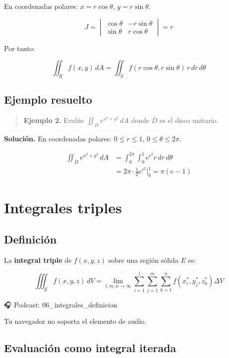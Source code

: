 \documentclass[
]{book}
\begin{document}
En coordenadas polares: \(x = r\cos\theta\), \(y = r\sin\theta\).

\[
J = \begin{vmatrix}
\cos\theta & -r\sin\theta \\
\sin\theta & r\cos\theta
\end{vmatrix} = r
\]

Por tanto:

\[
\iint_R f(x, y) \, dA = \iint_S f(r\cos\theta, r\sin\theta) \, r \, dr \, d\theta
\]

\subsection{Ejemplo resuelto}\label{ejemplo-resuelto-23}

\begin{quote}
\textbf{Ejemplo 2.} Evalúe \(\iint_D e^{x^2 + y^2} \, dA\) donde \(D\) es el disco unitario.
\end{quote}

\textbf{Solución.} En coordenadas polares: \(0 \leq r \leq 1\), \(0 \leq \theta \leq 2\pi\).

\[
\begin{aligned}
\iint_D e^{x^2 + y^2} \, dA &= \int_0^{2\pi} \int_0^1 e^{r^2} r \, dr \, d\theta \\
&= 2\pi \cdot \frac{1}{2} e^{r^2} \Big|_0^1 = \pi(e - 1)
\end{aligned}
\]

\section{Integrales triples}\label{integrales-triples}

\subsection{Definición}\label{definiciuxf3n-5}

La \textbf{integral triple} de \(f(x, y, z)\) sobre una región sólida \(E\) es:

\[
\iiint_E f(x, y, z) \, dV = \lim_{l,m,n \to \infty} \sum_{i=1}^l \sum_{j=1}^m \sum_{k=1}^n f(x_i^*, y_j^*, z_k^*) \Delta V
\]

🎧 Podcast: 06\_integrales\_definicion

Tu navegador no soporta el elemento de audio.

\subsection{Evaluación como integral iterada}\label{evaluaciuxf3n-como-integral-iterada}
\end{document}
